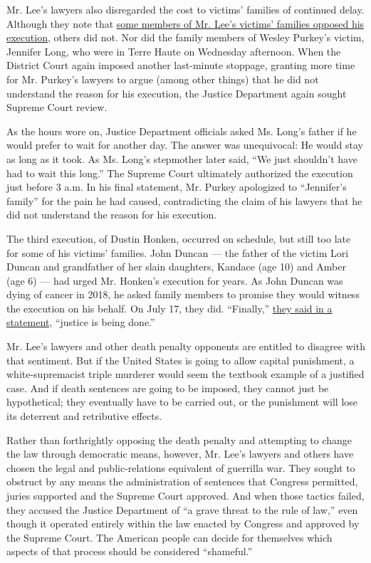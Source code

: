 Mr. Lee's lawyers also disregarded the cost to victims' families of
continued delay. Although they note that
\href{https://www.nytimes.com/2019/10/29/us/arkansas-federal-death-penalty.html?action=click\&module=RelatedLinks\&pgtype=Article}{some
members of Mr. Lee's victims' families opposed his execution,} others
did not. Nor did the family members of Wesley Purkey's victim, Jennifer
Long, who were in Terre Haute on Wednesday afternoon. When the District
Court again imposed another last-minute stoppage, granting more time for
Mr. Purkey's lawyers to argue (among other things) that he did not
understand the reason for his execution, the Justice Department again
sought Supreme Court review.

As the hours wore on, Justice Department officials asked Ms. Long's
father if he would prefer to wait for another day. The answer was
unequivocal: He would stay as long as it took. As Ms. Long's stepmother
later said, ``We just shouldn't have had to wait this long.'' The
Supreme Court ultimately authorized the execution just before 3 a.m. In
his final statement, Mr. Purkey apologized to ``Jennifer's family'' for
the pain he had caused, contradicting the claim of his lawyers that he
did not understand the reason for his execution.

The third execution, of Dustin Honken, occurred on schedule, but still
too late for some of his victims' families. John Duncan --- the father
of the victim Lori Duncan and grandfather of her slain daughters,
Kandace (age 10) and Amber (age 6) --- had urged Mr. Honken's execution
for years. As John Duncan was dying of cancer in 2018, he asked family
members to promise they would witness the execution on his behalf. On
July 17, they did. ``Finally,''
\href{https://www.desmoinesregister.com/story/news/local/columnists/courtney-crowder/2020/07/17/dustin-honken-execution-iowa-man-executed-federal-prison-terre-haute-indiana-methamphetamine-murder/5456933002/}{they
said in a statement,} ``justice is being done.''

Mr. Lee's lawyers and other death penalty opponents are entitled to
disagree with that sentiment. But if the United States is going to allow
capital punishment, a white-supremacist triple murderer would seem the
textbook example of a justified case. And if death sentences are going
to be imposed, they cannot just be hypothetical; they eventually have to
be carried out, or the punishment will lose its deterrent and
retributive effects.

Rather than forthrightly opposing the death penalty and attempting to
change the law through democratic means, however, Mr. Lee's lawyers and
others have chosen the legal and public-relations equivalent of
guerrilla war. They sought to obstruct by any means the administration
of sentences that Congress permitted, juries supported and the Supreme
Court approved. And when those tactics failed, they accused the Justice
Department of ``a grave threat to the rule of law,'' even though it
operated entirely within the law enacted by Congress and approved by the
Supreme Court. The American people can decide for themselves which
aspects of that process should be considered ``shameful.''

